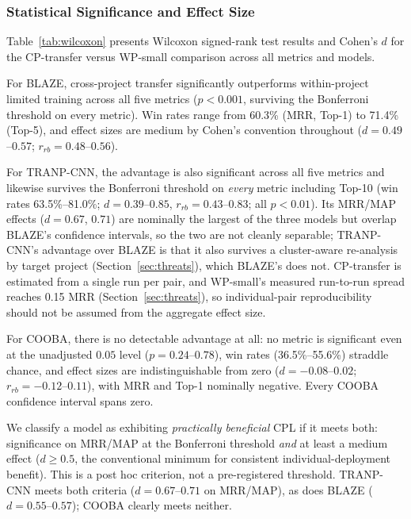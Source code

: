 \documentclass[a4paper,fleqn]{cas-dc}
\begin{document}
\subsubsection{Statistical Significance and Effect Size}

Table~\ref{tab:wilcoxon} presents Wilcoxon signed-rank test results and Cohen's $d$
for the CP-transfer versus WP-small comparison across all metrics and models.

For BLAZE, cross-project transfer significantly outperforms within-project
limited training across all five metrics ($p < 0.001$, surviving the
Bonferroni threshold on every metric). Win rates range from 60.3\% (MRR,
Top-1) to 71.4\% (Top-5), and effect sizes are medium by Cohen's convention
throughout ($d = 0.49$--$0.57$; $r_{rb} = 0.48$--$0.56$).

For TRANP-CNN, the advantage is also significant across all five metrics and
likewise survives the Bonferroni threshold on \emph{every} metric including
Top-10 (win rates 63.5\%--81.0\%; $d = 0.39$--$0.85$, $r_{rb} = 0.43$--$0.83$;
all $p < 0.01$). Its MRR/MAP effects ($d = 0.67$, $0.71$) are nominally the
largest of the three models but overlap BLAZE's confidence intervals, so the
two are not cleanly separable; TRANP-CNN's advantage over BLAZE is that it
also survives a cluster-aware re-analysis by target project
(Section~\ref{sec:threats}), which BLAZE's does not. CP-transfer is estimated
from a single run per pair, and WP-small's measured run-to-run spread reaches
0.15 MRR (Section~\ref{sec:threats}), so individual-pair reproducibility
should not be assumed from the aggregate effect size.

 For COOBA, there is no detectable advantage at all: no metric is
significant even at the unadjusted $0.05$ level ($p = 0.24$--$0.78$), win
rates (36.5\%--55.6\%) straddle chance, and effect sizes are indistinguishable
from zero ($d = -0.08$--$0.02$; $r_{rb} = -0.12$--$0.11$), with MRR and Top-1
nominally negative. Every COOBA confidence interval spans zero.

We classify a model as exhibiting \emph{practically beneficial} CPL if
it meets both: significance on MRR/MAP at the Bonferroni threshold \emph{and}
at least a medium effect ($d \geq 0.5$, the conventional minimum for
consistent individual-deployment benefit). This is a post hoc criterion,
not a pre-registered threshold. TRANP-CNN meets both
criteria ($d = 0.67$--$0.71$ on MRR/MAP), as does BLAZE
($d = 0.55$--$0.57$); COOBA clearly meets neither.
\end{document}
